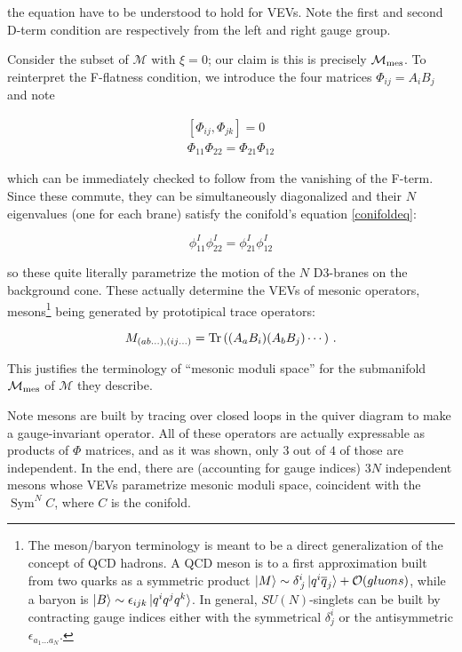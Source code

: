the equation have to be understood to hold for VEVs. Note the first and second D-term condition are respectively from the left and right gauge group. 

Consider the subset of $\mathcal{M}$ with $\xi = 0$; our claim is this is precisely $\mathcal{M}_\mathrm{mes}$. To reinterpret the F-flatness condition, we introduce the four matrices $\Phi_{ij} = A_i B_j$ and note

\begin{align}
	\left[ \Phi_{ij} , \Phi_{jk} \right] = 0\\
	\Phi_{11} \Phi_{22} = \Phi_{21}\Phi_{12}
	\label{}
\end{align}

which can be immediately checked to follow from the vanishing of the F-term. Since these commute, they can be simultaneously diagonalized and their $N$ eigenvalues (one for each brane) satisfy the conifold's equation \eqref{conifoldeq}:

\begin{equation}
	\phi^I_{11} \phi^I_{22} = \phi_{21}^I \phi_{12}^I
	\label{}
\end{equation}

so these quite literally parametrize the motion of the $N$ D3-branes on the background cone. These actually determine the VEVs of mesonic operators, mesons\footnote{The meson/baryon terminology is meant to be a direct generalization of the concept of QCD hadrons. A QCD meson is to a first approximation built from two quarks as a symmetric product $\ket{M} \sim \delta^i_{\,j} \ket{q^i \overline q_j} + \mathcal O (gluons)$, while a baryon is $\ket{B} \sim \epsilon_{ijk} \ket{q^i q^j q^k}$. In general, $SU(N)$-singlets can be built by contracting gauge indices either with the symmetrical $\delta^i_j$ or the antisymmetric $\epsilon_{a_1 \ldots a_N}$.} being generated by prototipical trace operators:

\begin{equation}
	M_{(ab\ldots),(ij\ldots)} =	\operatorname{Tr}\left( (A_a B_i)(A_b B_j)\cdots \right)\,.
	\label{}
\end{equation}

This justifies the terminology of ``mesonic moduli space'' for the submanifold $\mathcal{M}_\mathrm{mes}$ of $\mathcal{M}$ they describe.

Note mesons are built by tracing over closed loops in the quiver diagram to make a gauge-invariant operator. All of these operators are actually expressable as products of $\Phi$ matrices, and as it was shown, only $3$ out of $4$ of those are independent. In the end, there are (accounting for gauge indices) $3N$ independent mesons whose VEVs parametrize mesonic moduli space, coincident with the $\operatorname{Sym}^N C$, where $C$ is the conifold.


